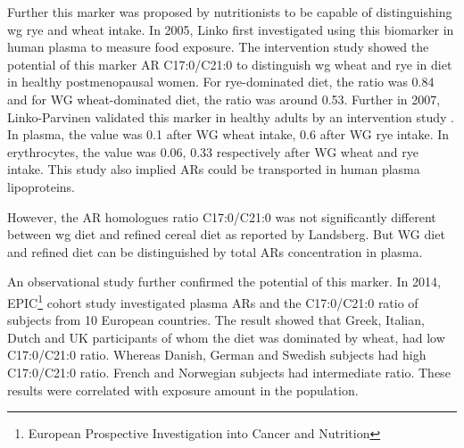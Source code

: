Further this marker was proposed by nutritionists to be capable of distinguishing \acrshort{wg} rye and wheat intake. In 2005, Linko\cite{ISI:000376712600013} first investigated using this biomarker in human plasma to measure food exposure. The intervention study showed the potential of this marker AR C17:0/C21:0 to distinguish \acrshort{wg} wheat and rye in diet in healthy postmenopausal women. 
For rye-dominated diet, the ratio was 0.84 and for WG wheat-dominated diet, the ratio was around 0.53. 
Further in 2007, Linko-Parvinen validated this marker in healthy adults by an intervention study \cite{10.1093/jn/137.5.1137}.
In plasma, the value was 0.1 after WG wheat intake, 0.6 after WG rye intake. In erythrocytes, the value was 0.06, 0.33 respectively after WG wheat and rye intake. This study also implied ARs could be transported in human plasma lipoproteins.

However, the AR homologues ratio C17:0/C21:0 was not significantly different between \acrshort{wg} diet and refined cereal diet as reported by Landsberg\cite{ISI:000255012000007}. But WG diet and refined diet can be distinguished by total ARs concentration in plasma.

An observational study further confirmed the potential of this marker.
In 2014, EPIC\footnote{European Prospective Investigation into Cancer and Nutrition} cohort study investigated plasma ARs and the C17:0/C21:0 ratio of subjects from 10 European countries. 
The result showed that Greek, Italian, Dutch and UK participants of whom the diet was dominated by wheat, had low C17:0/C21:0 ratio. Whereas Danish, German and Swedish subjects had high C17:0/C21:0 ratio. French and Norwegian subjects had intermediate ratio. These results were correlated with exposure amount in the population.



